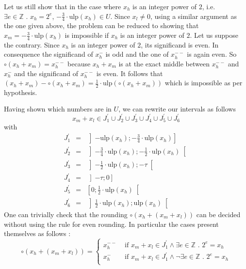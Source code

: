 \documentclass[a4paper,10pt,twoside]{article}
\newenvironment{proof}[1][Proof]{\begin{trivlist}
\item[\hskip \labelsep {\bfseries #1}]}{\end{trivlist}}
\newcommand{\Z}{\ensuremath{\mathbb {Z}}}
\newcommand{\hi}{\ensuremath{\mathit{h}}}
\newcommand{\mi}{\ensuremath{\mathit{m}}}
\newcommand{\lo}{\ensuremath{\mathit{l}}}
\newcommand{\mUlp}{\ensuremath{\mathrm{ulp}}}
\begin{document}
\begin{proof}
Let us still show that in the case where $x_\hi$ is an integer power of $2$, i.e.
$\exists e \in \Z \mbox{ . } x_\hi = 2^e$, $-\frac{3}{4} \cdot \mUlp\left( x_\hi \right) \in U$.
Since $x_\lo \not = 0$, using a similar argument as the one given above, the problem can be reduced to showing
that $x_\mi = - \frac{3}{4} \cdot \mUlp \left( x_\hi \right)$ is impossible if $x_\hi$ is an integer power of $2$.
Let us suppose the contrary. Since $x_\hi$ is an integer power of $2$, its significand is even. In consequence
the significand of $x_\hi^-$ is odd and the one of $x_\hi^{--}$ is again even. So
$\circ\left( x_\hi + x_\mi \right) = x_\hi^{--}$ because $x_\hi + x_\mi$ is at the exact middle between
$x_\hi^{--}$ and $x_\hi^{-}$ and the significand of $x_\hi^{--}$ is even. It follows that
$\left( x_\hi + x_\mi \right) - \circ\left( x_\hi + x_\mi \right) =
\frac{1}{2} \cdot \mUlp \left( \circ\left( x_\hi + x_\mi \right) \right)$ which is impossible as per hypothesis. \par
Having shown which numbers are in $U$, we can rewrite our intervals as follows
$$x_\mi + x_\lo \in J^\prime_1 \cup J^\prime_2 \cup J^\prime_3 \cup J^\prime_4 \cup J^\prime_5 \cup J^\prime_6$$
with
\begin{eqnarray*}
J^\prime_1 & = & \left] - \mUlp\left( x_\hi \right) ; - \frac{3}{4} \cdot \mUlp\left( x_\hi \right) \right] \\
J^\prime_2 & = & \left] - \frac{3}{4} \cdot \mUlp\left( x_\hi \right) ;
- \frac{1}{2} \cdot \mUlp\left( x_\hi \right) \right[ \\
J^\prime_3 & = & \left] - \frac{1}{2} \cdot \mUlp\left( x_\hi \right) ; - \tau \right[ \\
J^\prime_4 & = & \left] - \tau ; 0 \right] \\
J^\prime_5 & = & \left[ 0 ; \frac{1}{2} \cdot \mUlp\left( x_\hi \right) \right[ \\
J^\prime_6 & = & \left] \frac{1}{2} \cdot \mUlp\left( x_\hi \right) ; \mUlp\left( x_\hi \right) \right[
\end{eqnarray*}
One can trivially check that the rounding $\circ \left( x_\hi + \left( x_\mi + x_\lo \right) \right)$ can be decided without
using the rule for even rounding.
In particular the cases present themselves as follows \cite{IEEE754}:
$$\circ \left( x_\hi + \left( x_\mi + x_\lo\right) \right) = \left \lbrace
\begin{array}{ll}
x_\hi^{--} & \mbox{ if } x_\mi + x_\lo \in J^\prime_1 \land \exists e \in \Z \mbox{ . } 2^e = x_\hi \\
x_\hi^- & \mbox{ if } x_\mi + x_\lo \in J^\prime_1 \land \lnot \exists e \in \Z \mbox{ . } 2^e = x_\hi \\

\end{array}$$
\end{proof}
\end{document}
